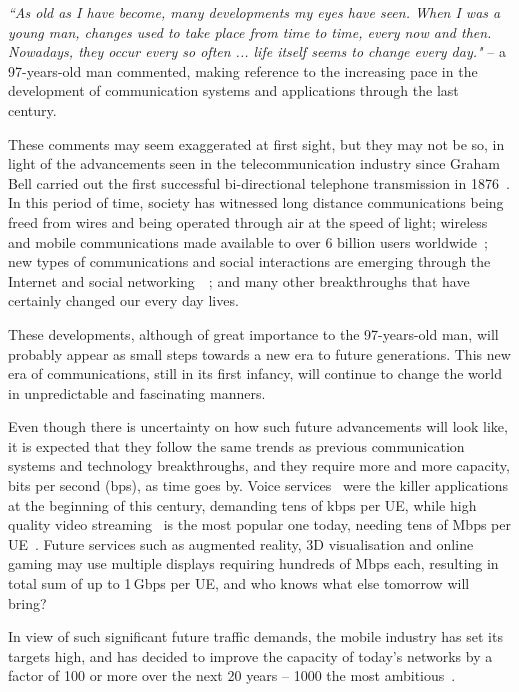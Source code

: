 \documentclass{IEEEtran}
\begin{document}
\emph{``As old as I have become,
many developments my eyes have seen.
When I was a young man,
changes used to take place from time to time,
every now and then.
Nowadays, they occur every so often ...
life itself seems to change every day."}
-- a 97-years-old man commented,
making reference to the increasing pace in the development of communication systems and applications through the last century.


These comments may seem exaggerated at first sight,
but they may not be so,
in light of the advancements seen in the telecommunication industry
since Graham Bell carried out the first successful bi-directional telephone transmission in 1876~\cite{GrahamBell}.
In this period of time,
society has witnessed long distance communications being freed from wires
and being operated through air at the speed of light;
wireless and mobile communications made available to over 6 billion users worldwide~\cite{MobiForge2014};
new types of communications and social interactions are emerging through the Internet and social networking~\cite{WWW}~\cite{SocialNetworks2013};
and many other breakthroughs that have certainly changed our every day lives.

These developments,
although of great importance to the 97-years-old man,
will probably appear as small steps towards a new era to future generations.
This new era of communications,
still in its first infancy,
will continue to change the world in unpredictable and fascinating manners.

Even though there is uncertainty on how such future advancements will look like,
it is expected that they follow the same trends as previous communication systems and technology breakthroughs,
and they require more and more capacity, bits per second (bps),
as time goes by.
Voice services~\cite{GSM} were the killer applications at the beginning of this century,
demanding tens of kbps per \ac{UE},
while high quality video streaming~\cite{Wu01streamingvideo} is the most popular one today,
needing tens of Mbps per \ac{UE}~\cite{1497859}.
Future services such as augmented reality, 3D visualisation and online gaming may use multiple displays requiring hundreds of Mbps each,
resulting in total sum of up to 1\,Gbps per \ac{UE},
and who knows what else tomorrow will bring?

\bigskip

In view of such significant future traffic demands,
the mobile industry has set its targets high,
and has decided to improve the capacity of today's networks
by a factor of 100 or more over the next 20 years
-- 1000 the most ambitious~\cite{qualcom2012}.
\end{document}
